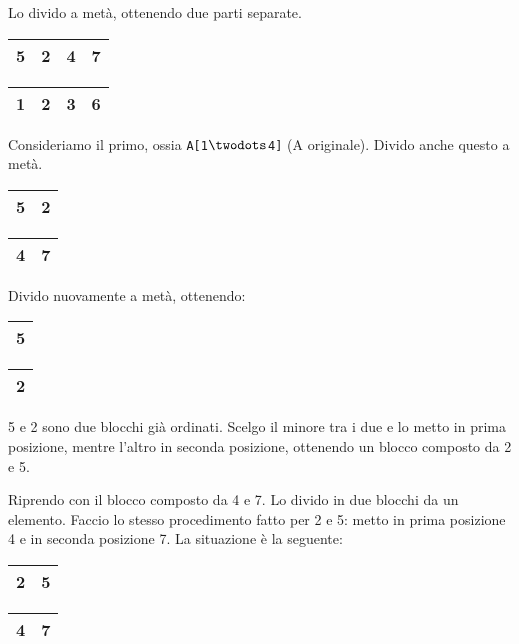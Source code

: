 Lo divido a metà, ottenendo due parti separate.

\begin{center}
	\begin{tabular}{|l|l|l|l|}
		\hline
		5 & 2 & 4 & 7 \\
		\hline
	\end{tabular}
	\hspace{1cm}
	\begin{tabular}{|l|l|l|l|}
		\hline
		1 & 2 & 3 & 6 \\
		\hline
	\end{tabular}
\end{center}

Consideriamo il primo, ossia \texttt{A[1$\twodots$4]} (A originale). Divido anche questo a metà.

\begin{center}
	\begin{tabular}{|l|l|}
		\hline
		5 & 2 \\
		\hline
	\end{tabular}
	\hspace{1cm}
	\begin{tabular}{|l|l|}
		\hline
		4 & 7 \\
		\hline
	\end{tabular}
\end{center}

Divido nuovamente a metà, ottenendo:

\begin{center}
	\begin{tabular}{|l|}
		\hline
		5 \\
		\hline
	\end{tabular}
	\hspace{1cm}
	\begin{tabular}{|l|}
		\hline
		2 \\
		\hline
	\end{tabular}
\end{center}

5 e 2 sono due blocchi già ordinati. Scelgo il minore tra i due e lo metto in prima 
posizione, mentre l'altro in seconda posizione, ottenendo un blocco composto da 2 e 5.\par
Riprendo con il blocco composto da 4 e 7. Lo divido in due blocchi da un elemento. Faccio lo stesso procedimento 
fatto per 2 e 5: metto in prima posizione 4 e in seconda posizione 7. La situazione
è la seguente:

\begin{center}
	\begin{tabular}{|l|l|}
		\hline
		2 & 5 \\
		\hline
	\end{tabular}
	\hspace{1cm}
	\begin{tabular}{|l|l|}
		\hline
		4 & 7 \\
		\hline
	\end{tabular}
\end{center}


